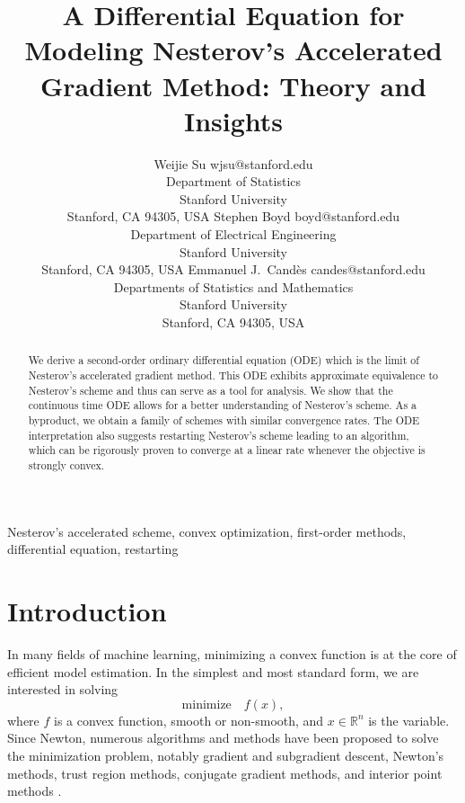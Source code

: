 \documentclass[twoside,11pt]{article}
\newcommand{\R}{\mathbb{R}}
\newcommand{\wjs}[1]{\textcolor{wjs}{[WJS: #1]}}
\begin{document}
\title{A Differential Equation for Modeling Nesterov's Accelerated Gradient Method: Theory and Insights}

\author{\name Weijie Su \email wjsu@stanford.edu \\
       \addr Department of Statistics\\
       Stanford University\\
       Stanford, CA 94305, USA
       \AND
       \name Stephen Boyd \email boyd@stanford.edu \\
       \addr Department of Electrical Engineering\\
        Stanford University\\
        Stanford, CA 94305, USA 
        \AND
        \name Emmanuel J.~Cand\`es \email candes@stanford.edu\\
        \addr Departments of Statistics and Mathematics\\
       Stanford University\\
       Stanford, CA 94305, USA
}
\editor{}
\maketitle

\begin{abstract}%
We derive a second-order ordinary differential equation (ODE) which is the limit of Nesterov's accelerated gradient method. This ODE exhibits approximate equivalence to Nesterov's scheme and thus can serve as a tool for analysis. We show that the continuous time ODE allows for a better understanding of Nesterov's scheme. As a byproduct, we obtain a family of schemes with similar convergence rates. The ODE interpretation also suggests restarting Nesterov's scheme leading to an algorithm, which can be rigorously proven to converge at a linear rate whenever the objective is strongly convex.
\end{abstract}

\begin{keywords}
Nesterov's accelerated scheme, convex optimization, first-order methods, differential equation, restarting
\end{keywords}

\section{Introduction}
In many fields of machine learning, minimizing a convex function is at the core of efficient model estimation. In the simplest and most standard form,  we are interested in solving 
\[\mbox{minimize}\quad f(x),\] where $f$ is a convex function, smooth or non-smooth, and $x \in \R^n$ is the variable. Since Newton, numerous algorithms and methods have been proposed to solve the minimization problem, notably gradient and subgradient descent, Newton's methods, trust region methods, conjugate gradient methods, and interior point methods \citep[see e.g.][for expositions]{polyak1987, boydconvex,nocedal2006numerical,ruszczynski2006,ADMM,shor2012,beck2014introduction}.
\end{document}
